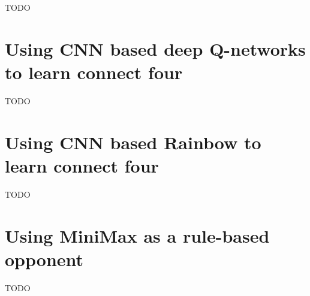 TODO


\section{Using CNN based deep Q-networks to learn connect four}
\label{sec:connect_four_rl-cnn-dqn}

TODO


\section{Using CNN based Rainbow to learn connect four}
\label{sec:connect_four_rl-dqn}

TODO


\section{Using MiniMax as a rule-based opponent}
\label{sec:connect_four_rl-minimax_opponent}

TODO